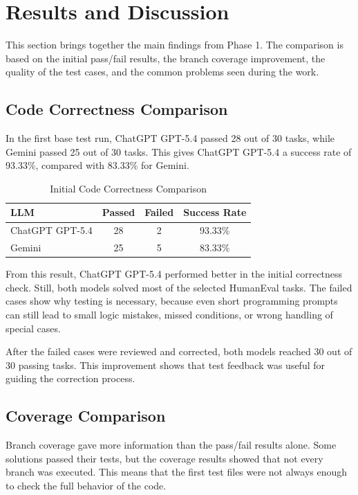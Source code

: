 \documentclass[journal]{IEEEtran}
\begin{document}
\section{Results and Discussion}

This section brings together the main findings from Phase 1. The comparison is based on the initial pass/fail results, the branch coverage improvement, the quality of the test cases, and the common problems seen during the work.

\subsection{Code Correctness Comparison}

In the first base test run, ChatGPT GPT-5.4 passed 28 out of 30 tasks, while Gemini passed 25 out of 30 tasks. This gives ChatGPT GPT-5.4 a success rate of 93.33\%, compared with 83.33\% for Gemini.

\begin{table}[!t]
\renewcommand{\arraystretch}{1.2}
\caption{Initial Code Correctness Comparison}
\label{tab:correctness-comparison}
\centering
\begin{tabular}{lccc}
\toprule
\textbf{LLM} & \textbf{Passed} & \textbf{Failed} & \textbf{Success Rate} \\
\midrule
ChatGPT GPT-5.4 & 28 & 2 & 93.33\% \\
Gemini & 25 & 5 & 83.33\% \\
\bottomrule
\end{tabular}
\end{table}

From this result, ChatGPT GPT-5.4 performed better in the initial correctness check. Still, both models solved most of the selected HumanEval tasks. The failed cases show why testing is necessary, because even short programming prompts can still lead to small logic mistakes, missed conditions, or wrong handling of special cases.

After the failed cases were reviewed and corrected, both models reached 30 out of 30 passing tasks. This improvement shows that test feedback was useful for guiding the correction process.

\subsection{Coverage Comparison}

Branch coverage gave more information than the pass/fail results alone. Some solutions passed their tests, but the coverage results showed that not every branch was executed. This means that the first test files were not always enough to check the full behavior of the code.
\end{document}
